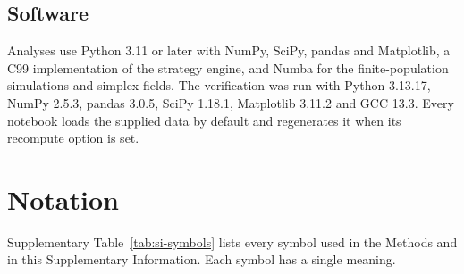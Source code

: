 \documentclass[10pt]{wlscirep}
\theoremstyle{plain}
\theoremstyle{remark}
\begin{document}
\subsection{Software}

Analyses use Python 3.11 or later with NumPy, SciPy, pandas and Matplotlib, a C99 implementation of the strategy engine, and Numba for the finite-population simulations and simplex fields. The verification was run with Python 3.13.17, NumPy 2.5.3, pandas 3.0.5, SciPy 1.18.1, Matplotlib 3.11.2 and GCC 13.3. Every notebook loads the supplied data by default and regenerates it when its recompute option is set.

\FloatBarrier
\section{Notation}
\label{si:notation}

Supplementary Table~\ref{tab:si-symbols} lists every symbol used in the Methods and in this Supplementary Information. Each symbol has a single meaning.
\end{document}
